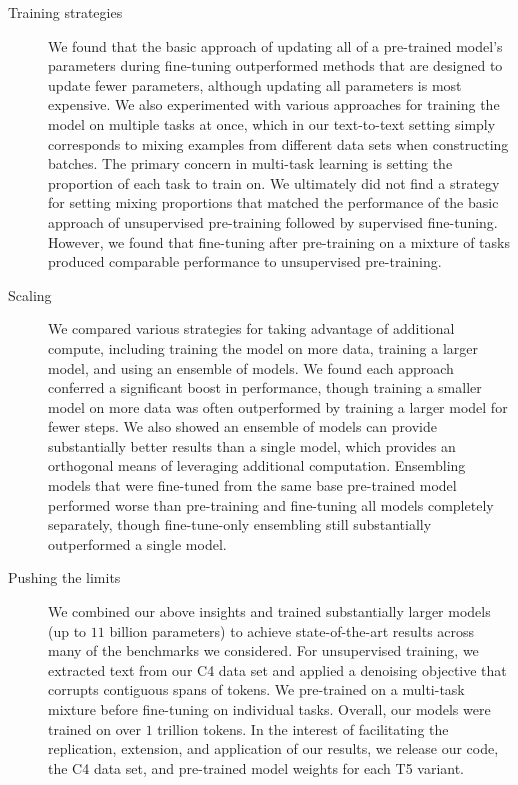 \begin{description}
\item[Training strategies] We found that the basic approach of updating all of a pre-trained model's parameters during fine-tuning outperformed methods that are designed to update fewer parameters, although updating all parameters is most expensive. We also experimented with various approaches for training the model on multiple tasks at once, which in our text-to-text setting simply corresponds to mixing examples from different data sets when constructing batches. The primary concern in multi-task learning is setting the proportion of each task to train on. We ultimately did not find a strategy for setting mixing proportions that matched the performance of the basic approach of unsupervised pre-training followed by supervised fine-tuning. However, we found that fine-tuning after pre-training on a mixture of tasks produced comparable performance to unsupervised pre-training.

\item[Scaling] We compared various strategies for taking advantage of additional compute, including training the model on more data, training a larger model, and using an ensemble of models. We found each approach conferred a significant boost in performance, though training a smaller model on more data was often outperformed by training a larger model for fewer steps. We also showed an ensemble of models can provide substantially better results than a single model, which provides an orthogonal means of leveraging additional computation. Ensembling models that were fine-tuned from the same base pre-trained model performed worse than pre-training and fine-tuning all models completely separately, though fine-tune-only ensembling still substantially outperformed a single model.

\item[Pushing the limits] We combined our above insights and trained substantially larger models (up to $11$ billion parameters) to achieve state-of-the-art results across many of the benchmarks we considered. For unsupervised training, we extracted text from our C4 data set and applied a denoising objective that corrupts contiguous spans of tokens. We pre-trained on a multi-task mixture before fine-tuning on individual tasks. Overall, our models were trained on over $1$ trillion tokens. In the interest of facilitating the replication, extension, and application of our results, we release our code, the C4 data set, and pre-trained model weights for each T5 variant.

\end{description}


